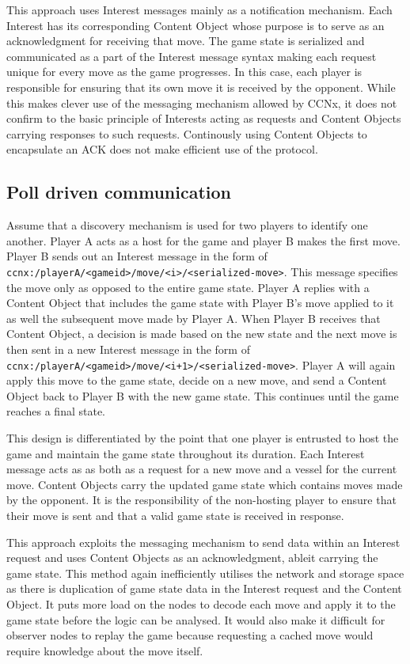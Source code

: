 \documentclass[a4paper,12pt]{report}      %
\begin{document}
This approach uses Interest messages mainly as a notification mechanism. Each Interest has its
corresponding Content Object whose purpose is to serve as an acknowledgment for receiving that
move. The game state is serialized and communicated as a part of the Interest message syntax making
each request unique for every move as the game progresses. In this case, each player is responsible for
ensuring that its own move it is received by the opponent. While this makes clever use of the messaging
mechanism allowed by CCNx, it does not confirm to the basic principle of Interests acting as requests and 
Content Objects carrying responses to such requests. Continously using Content Objects to encapsulate an ACK 
does not make efficient use of the protocol.

\subsection{Poll driven communication}

Assume that a discovery mechanism is used for two players to identify one another. Player A acts as a
host for the game and player B makes the first move. Player B sends out an Interest message in the
form of \verb!ccnx:/playerA/<gameid>/move/<i>/<serialized-move>!. This message specifies the move only 
as opposed to the entire game state. Player A replies with a Content Object that includes the game state
with Player B's move applied to it as well the subsequent move made by Player A. When Player B
receives that Content Object, a decision is made based on the new state and the next move is then sent 
in a new Interest message in the form of \verb!ccnx:/playerA/<gameid>/move/<i+1>/<serialized-move>!. 
Player A will again apply this move to the game state, decide on a new move, and send a Content
Object back to Player B with the new game state. This continues until the game reaches a final state.

This design is differentiated by the point that one player is entrusted to host the game and maintain the
game state throughout its duration. Each Interest message acts as as both as a request for a new move
and a vessel for the current move. Content Objects carry the updated game state which contains moves
made by the opponent. It is the responsibility of the non-hosting player to ensure that their move is sent
and that a valid game state is received in response.

This approach exploits the messaging mechanism to send data within an Interest request and uses Content Objects
as an acknowledgment, ableit carrying the game state. This method again inefficiently utilises the network and storage space
 as there is duplication of game state data in the Interest request and the Content Object. It puts more load on the nodes
to decode each move and apply it to the game state before the logic can be analysed. It would also make it difficult
for observer nodes to replay the game because requesting a cached move would require knowledge about the move itself.
\end{document}
